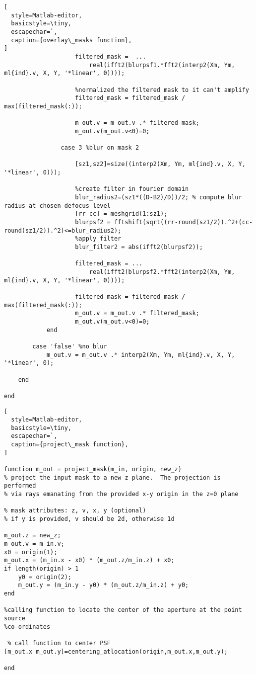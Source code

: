 \begin{lstlisting}[
  style=Matlab-editor,
  basicstyle=\tiny,
  escapechar=`,
  caption={overlay\_masks function},
]
                    filtered_mask =  ...
						real(ifft2(blurpsf1.*fft2(interp2(Xm, Ym, ml{ind}.v, X, Y, '*linear', 0))));
                    
                    %normalized the filtered mask to it can't amplify
                    filtered_mask = filtered_mask / max(filtered_mask(:));
                    
                    m_out.v = m_out.v .* filtered_mask;
                    m_out.v(m_out.v<0)=0;
                    
                case 3 %blur on mask 2
                    
                    [sz1,sz2]=size((interp2(Xm, Ym, ml{ind}.v, X, Y, '*linear', 0)));
                    
                    %create filter in fourier domain
                    blur_radius2=(sz1*((D-B2)/D))/2; % compute blur radius at chosen defocus level
                    [rr cc] = meshgrid(1:sz1);
                    blurpsf2 = fftshift(sqrt((rr-round(sz1/2)).^2+(cc-round(sz1/2)).^2)<=blur_radius2);
                    %apply filter
                    blur_filter2 = abs(ifft2(blurpsf2));
                    
                    filtered_mask = ...
						real(ifft2(blurpsf2.*fft2(interp2(Xm, Ym, ml{ind}.v, X, Y, '*linear', 0))));
                    
                    filtered_mask = filtered_mask / max(filtered_mask(:));
                    m_out.v = m_out.v .* filtered_mask;
                    m_out.v(m_out.v<0)=0;
            end
            
        case 'false' %no blur
            m_out.v = m_out.v .* interp2(Xm, Ym, ml{ind}.v, X, Y, '*linear', 0);
            
    end
    
end

\end{lstlisting}


\begin{lstlisting}[
  style=Matlab-editor,
  basicstyle=\tiny,
  escapechar=`,
  caption={project\_mask function},
]

function m_out = project_mask(m_in, origin, new_z)
% project the input mask to a new z plane.  The projection is performed
% via rays emanating from the provided x-y origin in the z=0 plane

% mask attributes: z, v, x, y (optional)
% if y is provided, v should be 2d, otherwise 1d

m_out.z = new_z;
m_out.v = m_in.v;
x0 = origin(1);
m_out.x = (m_in.x - x0) * (m_out.z/m_in.z) + x0;
if length(origin) > 1
    y0 = origin(2);
    m_out.y = (m_in.y - y0) * (m_out.z/m_in.z) + y0;
end

%calling function to locate the center of the aperture at the point source
%co-ordinates

 % call function to center PSF 
[m_out.x m_out.y]=centering_atlocation(origin,m_out.x,m_out.y); 

end

\end{lstlisting}

